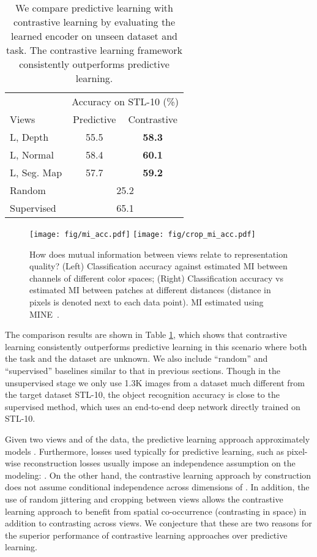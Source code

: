 \documentclass[10pt,twocolumn,letterpaper]{article}
\newcommand{\citep}[1]{\cite{#1}}
\begin{document}
\begin{table}[t]
\centering
	\centering
    \begin{tabular}{l|cc}
    & \multicolumn{2}{c}{Accuracy on STL-10 (\%)} \\
    \shline
    Views & Predictive  & Contrastive \\
    \hline
    L, Depth & 55.5 & \textbf{58.3} \\
    L, Normal & 58.4 & \textbf{60.1} \\
    L, Seg. Map & 57.7 & \textbf{59.2} \\
    \hline
    Random & \multicolumn{2}{c}{25.2} \\
    Supervised & \multicolumn{2}{c}{65.1} \\
    
    \end{tabular}
    
    \caption{\small{We compare predictive learning with contrastive learning by evaluating the learned encoder on unseen dataset and task. The contrastive learning framework consistently outperforms predictive learning.}}
    \label{tbl:nyu_compare}
\end{table} 
\begin{figure*}[t]
\centering
\texttt{[image: fig/mi\_acc.pdf]}
\texttt{[image: fig/crop\_mi\_acc.pdf]}
\caption{\small{How does mutual information between views relate to representation quality? (Left) Classification accuracy against estimated MI between channels of different color spaces; (Right) Classification accuracy vs  estimated MI between patches at different distances (distance in pixels is denoted next to each data point). MI estimated using MINE~\citep{belghazi2018mine}.}}
\label{fig:mi_vs_acc}
\end{figure*} 
The comparison results are shown in Table \ref{tbl:nyu_compare}, which shows that contrastive learning consistently outperforms predictive learning in this scenario where both the task and the dataset are unknown. We also include ``random'' and ``supervised'' baselines similar to that in previous sections. Though in the unsupervised stage we only use 1.3K images from a dataset much different from the target dataset STL-10, the object recognition accuracy is close to the supervised method, which uses an end-to-end deep network directly trained on STL-10.

Given two views  and  of the data, the predictive learning approach approximately models . Furthermore, losses used typically for predictive learning, such as pixel-wise reconstruction losses usually impose an independence assumption on the modeling: . On the other hand, the contrastive learning approach by construction does not assume conditional independence across dimensions of . In addition, the use of random jittering and cropping between views allows the contrastive learning approach to benefit from spatial co-occurrence (contrasting in space) in addition to contrasting across views. We conjecture that these are two reasons for the superior performance of contrastive learning approaches over predictive learning.
\end{document}
